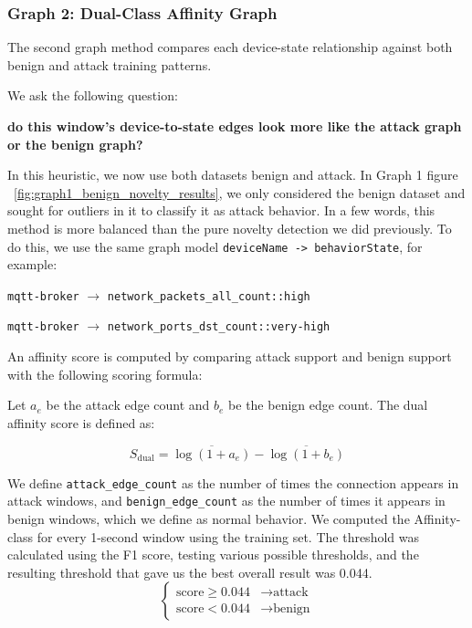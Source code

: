 \documentclass[final,5p,times,twocolumn]{elsarticle}
\begin{document}
\subsubsection{Graph 2: Dual-Class Affinity Graph}

The second graph method compares each device-state relationship against both benign and attack training patterns. 

We ask the following question: 
\begin{center}
\textbf{do this window's device-to-state edges look more like the attack graph or the benign graph?}
\end{center}
 In this heuristic, we now use both datasets benign and attack. In Graph 1 figure ~\ref{fig:graph1_benign_novelty_results}, we only considered the benign dataset and sought for outliers in it to classify it as attack behavior. In a few words, this method is more balanced than the pure novelty detection we did previously. To do this, we use the same graph model \texttt{deviceName -> behaviorState}, for example:

\begin{center}
\texttt{mqtt-broker} \(\rightarrow\) \texttt{network\_packets\_all\_count::high}

\texttt{mqtt-broker} \(\rightarrow\) \texttt{network\_ports\_dst\_count::very-high}
\end{center}

An affinity score is computed by comparing attack support and benign support with the following scoring formula:

Let \(a_e\) be the attack edge count and \(b_e\) be the benign edge count. The dual affinity score is defined as:

\[
S_{\mathrm{dual}}
=
\overline{\log(1+a_e)}
-
\overline{\log(1+b_e)}
\]

We define \texttt{attack\_edge\_count} as the number of times the connection appears in attack windows, and \texttt{benign\_edge\_count} as the number of times it appears in benign windows, which we define as normal behavior. We computed the Affinity-class for every 1-second window using the training set. The threshold was calculated using the F1 score, testing various possible thresholds, and the resulting threshold that gave us the best overall result was 0.044.
\[
\begin{cases}
\text{score} \geq 0.044 & \rightarrow \text{attack} \\
\text{score} < 0.044 & \rightarrow \text{benign}
\end{cases}
\]
\end{document}
